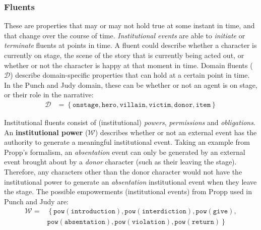 \documentclass[11pt]{report}
\begin{document}
\subsubsection{Fluents}
These are properties that may or may not hold true at some instant in time, and that change over the course of time. \emph{Institutional events} are able to \emph{initiate} or \emph{terminate} fluents at points in time. A fluent could describe whether a character is currently on stage, the scene of the story that is currently being acted out, or whether or not the character is happy at that moment in time.
Domain fluents ($\mathcal{D}$) describe domain-specific properties that can hold at a certain point in time. In the Punch and Judy domain, these can be whether or not an agent is on stage, or their role in the narrative: %
\begin{align*}
   \mathcal{D} &= \left\{\mathtt{onstage, hero, villain, victim, donor, item}\right\} %
\end{align*}

Institutional fluents consist of (institutional) \emph{powers}, \emph{permissions} and \emph{obligations}.
An \textbf{institutional power} ($\mathcal{W}$) describes whether or not an external event has the authority to generate a meaningful institutional event. Taking an example from Propp's formalism, an \emph{absentation\/} event can only be generated by an external event brought about by a \emph{donor\/} character (such as their leaving the stage). Therefore, any characters other than the donor character would not have the institutional power to generate an \emph{absentation\/} institutional event when they leave the stage.
The possible empowerments (institutional events) from Propp used in Punch and Judy are:
\begin{align*}
  \mathcal{W} =&\left\{\mathtt{pow(introduction), pow(interdiction), pow(give),}\right.\\ %
               &\left. {} \mathtt{pow(absentation), pow(violation), pow(return)}\right\} %
\end{align*}
\end{document}
